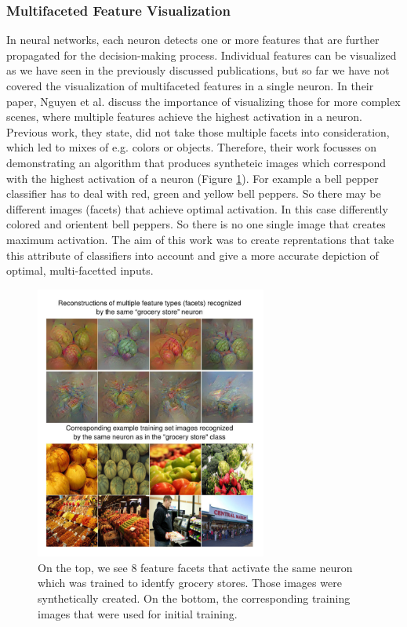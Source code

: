 \documentclass{acmsiggraph}               %
\begin{document}
\subsubsection{Multifaceted Feature Visualization}
In neural networks, each neuron detects one or more features that are further propagated for the decision-making process. Individual features can be visualized as we have seen in the previously discussed publications, but so far we have not covered the visualization of multifaceted features in a single neuron. In their paper, Nguyen et al. discuss the importance of visualizing those for more complex scenes, where multiple features achieve the highest activation in a neuron. \cite{Nguyen2016} Previous work, they state, did not take those multiple facets into consideration, which led to mixes of e.g. colors or objects. Therefore, their work focusses on demonstrating an algorithm that produces syntheteic images which correspond with the highest activation of a neuron (Figure \ref{fig:multi}). For example a bell pepper classifier has to deal with red, green and yellow bell peppers. So there may be different images (facets) that achieve optimal activation. In this case differently colored and orientent bell peppers. So there is no one single image that creates maximum activation. The aim of this work was to create reprentations that take this attribute of classifiers into account and give a more accurate depiction of optimal, multi-facetted inputs.

\begin{figure}[H]
\center
\includegraphics[width=3in]{multi-facet}
\caption{On the top, we see 8 feature facets that activate the same neuron which was trained to identfy grocery stores. Those images were synthetically created. On the bottom, the corresponding training images that were used for initial training. \protect\cite{Nguyen2016}}
\label{fig:multi}
\end{figure}
\end{document}
